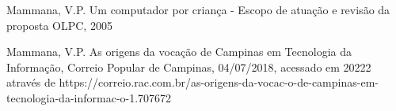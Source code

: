 \documentclass[
12pt,		%
openright,	%
twoside,  %
a4paper,			%
chapter=TITLE,		%
english,			%
french,				%
spanish,			%
brazil				%
]{USPSC-classe/USPSC}
\begin{document}
\begin{flushleft}
\begin{flushleft}
\begin{flushleft}
\begin{flushleft}
\begin{flushleft}
\begin{flushleft}
\begin{flushleft}
\begin{flushleft}
\begin{flushleft}
[MAMMANA, 2005a] Mammana, V.P. Um computador por crian\c{c}a - Escopo de atua\c{c}\~ao e revis\~ao da proposta OLPC, 2005
\end{flushleft}


\end{flushleft}


\end{flushleft}


\end{flushleft}


\end{flushleft}


\end{flushleft}


\end{flushleft}


\end{flushleft}


\end{flushleft}


\begin{flushleft}
\begin{flushleft}
\begin{flushleft}
\begin{flushleft}
\begin{flushleft}
\begin{flushleft}
\begin{flushleft}
\begin{flushleft}
\begin{flushleft}
[MAMMANA, 2018] Mammana, V.P. As origens da voca\c{c}\~ao de Campinas em Tecnologia da Informa\c{c}\~ao, Correio Popular de Campinas, 04/07/2018, acessado em 20222 atrav\'es de https://correio.rac.com.br/as-origens-da-vocac-o-de-campinas-em-tecnologia-da-informac-o-1.707672
\end{flushleft}


\end{flushleft}


\end{flushleft}


\end{flushleft}


\end{flushleft}


\end{flushleft}


\end{flushleft}


\end{flushleft}


\end{flushleft}
\end{document}

